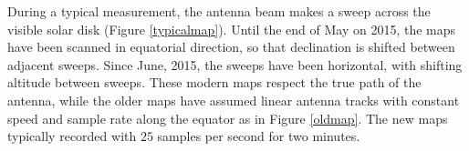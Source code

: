 \documentclass{aa}
\begin{document}
During a typical measurement, the antenna beam makes a sweep across the visible solar disk (Figure \ref{typicalmap}). 
Until the end of May on 2015, the maps have been scanned in equatorial direction, so that declination is shifted between
adjacent sweeps. Since June, 2015, the sweeps have been horizontal, with shifting altitude between sweeps. 
These modern 
maps respect the true path of the antenna, while the older maps have assumed linear antenna tracks with constant speed 
and 
sample rate along the equator as in Figure
\ref{oldmap}. The new maps typically recorded with $25$ samples per second for two minutes.
\end{document}
